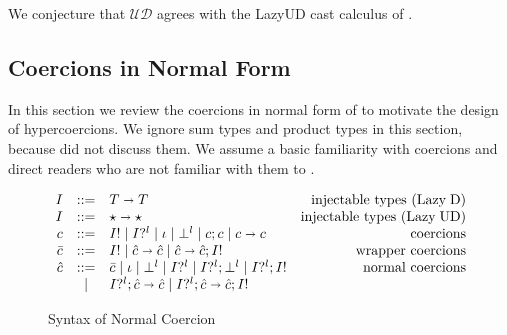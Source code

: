 \documentclass[acmsmall,review,anonymous]{acmart}\settopmatter{printfolios=true,printccs=false,printacmref=false}
\newcommand{\stxrule}[3]{#1 & ::= & #3 & \text{#2}\\}
\newcommand{\stxrulecont}[1]{& | & #1 & \\}
\newcommand{\plus}[0]{+}
\newcommand{\lazyUD}{Lazy\;UD}
\newcommand{\lazyD}{Lazy\;D}
\newcommand{\TOOdyn}[0]{\star}
\newcommand{\POOfun}[2]{#1 \shortrightarrow #2}
\newcommand{\POOprod}[2]{#1 \times #2}
\newcommand{\POOsum}[2]{#1 \plus #2}
\newcommand{\ncProj}[2]{#1?^{#2}}
\newcommand{\ncInj}[1]{#1!}
\newcommand{\ncId}[0]{\iota}
\newcommand{\ncSeq}[2]{#1;#2}
\newcommand{\ncFail}[1]{\bot^{#1}}
\newcommand{\ncFun}[2]{\POOfun{#1}{#2}}
\newcommand{\ncProd}[2]{\POOprod{#1}{#2}}
\newcommand{\ncSum}[2]{\POOsum{#1}{#2}}
\newcommand{\ineffCEKUD}{$\mathcal{UD}$}
\begin{document}
We conjecture that \ineffCEKUD{} agrees with the \lazyUD{} cast
calculus of \citet{siek2009exploring}.

\clearpage
\pagebreak

\subsection{Coercions in Normal Form} 
\label{sec:coercion-calculus}

In this section we review the coercions in normal form of
\citet{siek2012interpretations} to motivate the design of
hypercoercions.  We ignore sum types and product types in this
section, because \citet{siek2012interpretations} did not discuss
them. We assume a basic familiarity with coercions and direct readers
who are not familiar with them to \citet{siek2012interpretations}.

\begin{figure}
	\[
	\begin{array}{rclr}
	\stxrule{I}{injectable types (\lazyD)}{
		\POOfun{T}{T}}
	\stxrule{I}{injectable types (\lazyUD)}{
		\POOfun{\TOOdyn}{\TOOdyn}
	}
	\stxrule{c}{coercions}{
		\ncInj{I} \mid
		\ncProj{I}{l} \mid
		\ncId \mid
		\ncFail{l} \mid
		\ncSeq{c}{c} \mid
		\ncFun{c}{c}
	}
	\stxrule{\bar{c}}{wrapper coercions}{	
		\ncInj{I} \mid
		\ncFun{\hat{c}}{\hat{c}} \mid
		\ncSeq{\ncFun{\hat{c}}{\hat{c}}}{\ncInj{I}}
	}
	\stxrule{\hat{c}}{normal coercions}{
		\bar{c} \mid
		\ncId \mid
		\ncFail{l} \mid
		\ncProj{I}{l} \mid
		\ncSeq{\ncProj{I}{l}}{\ncFail{l}} \mid
		\ncSeq{\ncProj{I}{l}}{\ncInj{I}}
	}
	\stxrulecont{
		\ncSeq{\ncProj{I}{l}}{\ncFun{\hat{c}}{\hat{c}}} \mid
		\ncSeq{\ncProj{I}{l}}{\ncSeq{\ncFun{\hat{c}}{\hat{c}}}{\ncInj{I}}}
	}
	\end{array}
	\]
	\caption{Syntax of Normal Coercion}
	\label{fig:normal-coercion}
\end{figure}

\end{document}
